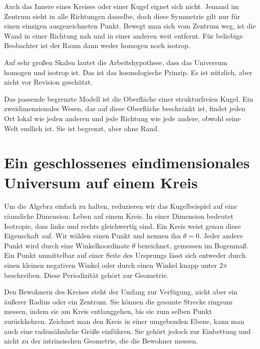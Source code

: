 Auch das Innere eines Kreises oder einer Kugel eignet sich nicht. Jemand im Zentrum sieht in alle Richtungen dasselbe, doch diese Symmetrie gilt nur für einen einzigen ausgezeichneten Punkt. Bewegt man sich vom Zentrum weg, ist die Wand in einer Richtung nah und in einer anderen weit entfernt. Für beliebige Beobachter ist der Raum dann weder homogen noch isotrop.

Auf sehr großen Skalen lautet die Arbeitshypothese, dass das Universum homogen und isotrop ist. Das ist das kosmologische Prinzip. Es ist nützlich, aber nicht vor Revision geschützt.

\begin{classroomqa}
\end{classroomqa}

Das passende begrenzte Modell ist die Oberfläche einer strukturfreien Kugel. Ein zweidimensionales Wesen, das auf diese Oberfläche beschränkt ist, findet jeden Ort lokal wie jeden anderen und jede Richtung wie jede andere, obwohl seine Welt endlich ist. Sie ist begrenzt, aber ohne Rand.

\section{Ein geschlossenes eindimensionales Universum auf einem Kreis}

Um die Algebra einfach zu halten, reduzieren wir das Kugelbeispiel auf eine räumliche Dimension: Leben auf einem Kreis. In einer Dimension bedeutet Isotropie, dass links und rechts gleichwertig sind. Ein Kreis weist genau diese Eigenschaft auf. Wir wählen einen Punkt und nennen ihn \(\theta=0\). Jeder andere Punkt wird durch eine Winkelkoordinate \(\theta\) bezeichnet, gemessen im Bogenmaß. Ein Punkt unmittelbar auf einer Seite des Ursprungs lässt sich entweder durch einen kleinen negativen Winkel oder durch einen Winkel knapp unter \(2\pi\) beschreiben. Diese Periodizität gehört zur Geometrie.

Den Bewohnern des Kreises steht der Umfang zur Verfügung, nicht aber ein äußerer Radius oder ein Zentrum. Sie können die gesamte Strecke ringsum messen, indem sie am Kreis entlanggehen, bis sie zum selben Punkt zurückkehren. Zeichnet man den Kreis in einer umgebenden Ebene, kann man auch eine radiusähnliche Größe einführen. Sie gehört jedoch zur Einbettung und nicht zu der intrinsischen Geometrie, die die Bewohner messen.

